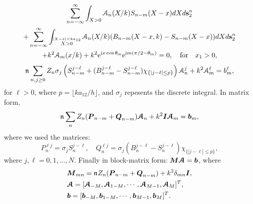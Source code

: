 \documentclass[12pt, a4paper]{article}
\begin{document}
\begin{multline}
  \sum_{n=-\infty}^\infty
  \int_{X>0} \mathcal A_n (X/k) S_{n-m}(X-x) dX
  d\mathbf s_2^n
  \\
  +  \sum_{n=-\infty}^\infty
    \int_{\stackrel{|X-x| < k a_{12}}{X>0}} \mathcal A_n (X/k) (B_{n-m}(X- x,k) - S_{n-m}(X-x) )dX
    d\mathbf s_2^n
\\
+  k^2 \mathcal A_m (x/k)   + k^2  \textrm{e}^{\textrm{i} x \cos \theta_{\mathrm{in}}} \textrm{e}^{\textrm{i} m ( \pi/2 - \theta_{\mathrm{in}} )}
   = 0, \quad \text{for} \quad x_1 >0,
  \label{eqn:ensemAsystem4}
\end{multline}
\begin{equation}
  \mathfrak n_{} \sum_{n,j \geq 0}  Z_n  \sigma_j  \left ( S_{n-m}^{j-\ell}
  +  (B_{n-m}^{j-\ell} - S_{n-m}^{j -\ell} ) \chi_{\{|j-\ell|\leq p\}} \right) \mathcal A_n^j+  k^2  \mathcal A_m^\ell  =  b_m^\ell,
  \label{eqn:ensemAsystemN}
\end{equation}
for $\ell >0$, where $p = \lfloor k a_{12}/h \rfloor$, and $\sigma_j$ repesents the discrete integral. In matrix form,
\begin{equation}
  \mathfrak n_{} \sum_{n}  Z_n ( \boldsymbol{P}_{n-m} + \boldsymbol{Q}_{n-m}) \boldsymbol{\mathcal A}_n
+  k^2 \boldsymbol{I} \boldsymbol{\mathcal A}_m  =  \boldsymbol{b}_m,
  \label{eqn:ensemAsystemN2}
\end{equation}
where we used the matrices:
\begin{equation}
  P_{n}^{\ell j} =  \sigma_j S_{n}^{j-\ell} , \quad Q_{n}^{\ell j} = \sigma_j (B_{n}^{j-\ell} - S_{n}^{j -\ell} ) \chi_{\{|j-\ell| \leq p\}},
\end{equation}
where $j,\ell = 0,1, \ldots, N$. Finally in block-matrix form: $\boldsymbol{M} \boldsymbol{\mathcal A}  =  \boldsymbol{b}$, where
\begin{align}
&\boldsymbol{M}_{mn} = \mathfrak n_{} Z_n ( \boldsymbol{P}_{n-m} + \boldsymbol{Q}_{n-m})+  k^2 \delta_{mn} \boldsymbol{I},
\\
& \boldsymbol{\mathcal A} = [ \boldsymbol{\mathcal A}_{-M}, \boldsymbol{\mathcal A}_{1-M}, \cdots, \boldsymbol{\mathcal A}_{M-1}, \boldsymbol{\mathcal A}_{M}]^T,
\\
& \boldsymbol{b} = [ \boldsymbol{b}_{-M}, \boldsymbol{b}_{1-M}, \cdots, \boldsymbol{b}_{M-1}, \boldsymbol{b}_{M}]^T.
  \label{eqn:ensemAsystemB}
\end{align}

\printbibliography

% 
% 
\end{document}
